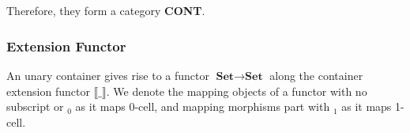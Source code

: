 \begin{code}%
\>[0]\AgdaSpace{}%
\AgdaSymbol{:}\AgdaSpace{}%
\AgdaSpace{}%
\AgdaSpace{}%
\<%
\\
\>[0]\AgdaSpace{}%
\AgdaSymbol{=}\AgdaSpace{}%
\AgdaSpace{}%
\AgdaSpace{}%
\AgdaSpace{}%
\AgdaSpace{}%
\AgdaSpace{}%
\<%
\\
%
\\[\AgdaEmptyExtraSkip]%
\>[0]\AgdaSpace{}%
\AgdaSymbol{:}\AgdaSpace{}%
\AgdaSpace{}%
\AgdaSpace{}%
\AgdaSpace{}%
\AgdaSpace{}%
\AgdaSpace{}%
\AgdaSpace{}%
\AgdaSpace{}%
\AgdaSpace{}%
\AgdaSpace{}%
\AgdaSpace{}%
\<%
\\
\>[0]\AgdaSymbol{(}\AgdaSpace{}%
\AgdaSpace{}%
\AgdaSymbol{)}\AgdaSpace{}%
\AgdaSpace{}%
\AgdaSymbol{(}\AgdaSpace{}%
\AgdaSpace{}%
\AgdaSymbol{)}\AgdaSpace{}%
\AgdaSymbol{=}\AgdaSpace{}%
\AgdaSymbol{(}\AgdaSpace{}%
\AgdaSpace{}%
\AgdaSymbol{)}\AgdaSpace{}%
\AgdaSpace{}%
\AgdaSpace{}%
\AgdaSpace{}%
\AgdaSpace{}%
\AgdaSpace{}%
\AgdaSpace{}%
\AgdaSpace{}%
\AgdaSpace{}%
\AgdaSymbol{(}\AgdaSpace{}%
\AgdaSymbol{)}\<%
\end{code}

Therefore, they form a category \textbf{CONT}.

\subsubsection*{Extension Functor}

An unary container gives rise to a functor $\textbf{Set} \to \textbf{Set}$ along the container extension functor $\llbracket\_\rrbracket$. We denote the mapping objects of a functor with no subscript or $_0$ as it maps 0-cell, and mapping morphisms part with $_1$ as it maps 1-cell.

